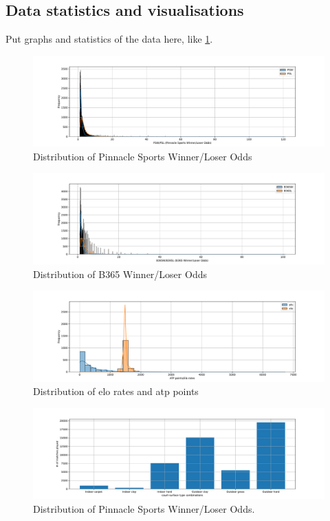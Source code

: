 \documentclass[preprint,aps,nofootinbib,a4paper,superscriptaddress,longbibliography,amsfonts,amssymb,amsmath,titlepage]{revtex4-2}
\begin{document}
\subsection{Data statistics and visualisations}
Put graphs and statistics of the data here, like \ref{ps-odds-dist}.
%
\begin{figure}[h]
\includegraphics[width=\textwidth]{pictures/ps-odds-dist.pdf}
\caption{Distribution of Pinnacle Sports Winner/Loser Odds}
\label{ps-odds-dist}
\end{figure}
%
%
\begin{figure}[h]
\includegraphics[width=\textwidth]{pictures/b365-odds-dist.pdf}
\caption{Distribution of B365 Winner/Loser Odds}
\label{b365-odds-dist}
\end{figure}
%
%
\begin{figure}[h]
\includegraphics[width=\textwidth]{pictures/elo-rates-atp-point-dist.pdf}
\caption{Distribution of elo rates and atp points}
\label{elo-rates-atp-point-dist}
\end{figure}
%
%
\begin{figure}[h]
\includegraphics[width=\textwidth]{pictures/match-count-field-type-dist.pdf}
\caption{Distribution of Pinnacle Sports Winner/Loser Odds.}
\label{match-count-field-type-dist}
\end{figure}
\end{document}
